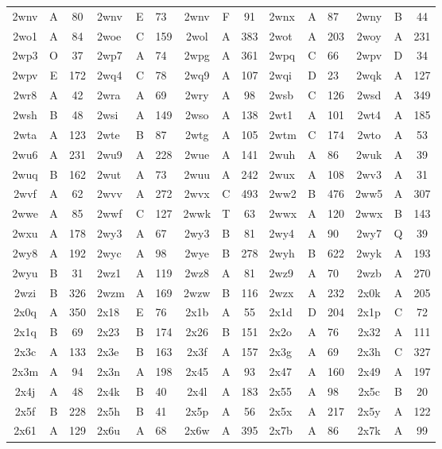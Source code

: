 \begin{longtable}{|c|c|c| a|a|a| c|c|c| a|a|a| c|c|c|}
2wnv & A & 80 & 2wnv & E & 73 & 2wnv & F & 91 & 2wnx & A & 87 & 2wny & B & 44\\
2wo1 & A & 84 & 2woe & C & 159 & 2wol & A & 383 & 2wot & A & 203 & 2woy & A & 231\\
2wp3 & O & 37 & 2wp7 & A & 74 & 2wpg & A & 361 & 2wpq & C & 66 & 2wpv & D & 34\\
2wpv & E & 172 & 2wq4 & C & 78 & 2wq9 & A & 107 & 2wqi & D & 23 & 2wqk & A & 127\\
2wr8 & A & 42 & 2wra & A & 69 & 2wry & A & 98 & 2wsb & C & 126 & 2wsd & A & 349\\
2wsh & B & 48 & 2wsi & A & 149 & 2wso & A & 138 & 2wt1 & A & 101 & 2wt4 & A & 185\\
2wta & A & 123 & 2wte & B & 87 & 2wtg & A & 105 & 2wtm & C & 174 & 2wto & A & 53\\
2wu6 & A & 231 & 2wu9 & A & 228 & 2wue & A & 141 & 2wuh & A & 86 & 2wuk & A & 39\\
2wuq & B & 162 & 2wut & A & 73 & 2wuu & A & 242 & 2wux & A & 108 & 2wv3 & A & 31\\
2wvf & A & 62 & 2wvv & A & 272 & 2wvx & C & 493 & 2ww2 & B & 476 & 2ww5 & A & 307\\
2wwe & A & 85 & 2wwf & C & 127 & 2wwk & T & 63 & 2wwx & A & 120 & 2wwx & B & 143\\
2wxu & A & 178 & 2wy3 & A & 67 & 2wy3 & B & 81 & 2wy4 & A & 90 & 2wy7 & Q & 39\\
2wy8 & A & 192 & 2wyc & A & 98 & 2wye & B & 278 & 2wyh & B & 622 & 2wyk & A & 193\\
2wyu & B & 31 & 2wz1 & A & 119 & 2wz8 & A & 81 & 2wz9 & A & 70 & 2wzb & A & 270\\
2wzi & B & 326 & 2wzm & A & 169 & 2wzw & B & 116 & 2wzx & A & 232 & 2x0k & A & 205\\
2x0q & A & 350 & 2x18 & E & 76 & 2x1b & A & 55 & 2x1d & D & 204 & 2x1p & C & 72\\
2x1q & B & 69 & 2x23 & B & 174 & 2x26 & B & 151 & 2x2o & A & 76 & 2x32 & A & 111\\
2x3c & A & 133 & 2x3e & B & 163 & 2x3f & A & 157 & 2x3g & A & 69 & 2x3h & C & 327\\
2x3m & A & 94 & 2x3n & A & 198 & 2x45 & A & 93 & 2x47 & A & 160 & 2x49 & A & 197\\
2x4j & A & 48 & 2x4k & B & 40 & 2x4l & A & 183 & 2x55 & A & 98 & 2x5c & B & 20\\
2x5f & B & 228 & 2x5h & B & 41 & 2x5p & A & 56 & 2x5x & A & 217 & 2x5y & A & 122\\
2x61 & A & 129 & 2x6u & A & 68 & 2x6w & A & 395 & 2x7b & A & 86 & 2x7k & A & 99\\

\end{longtable}
